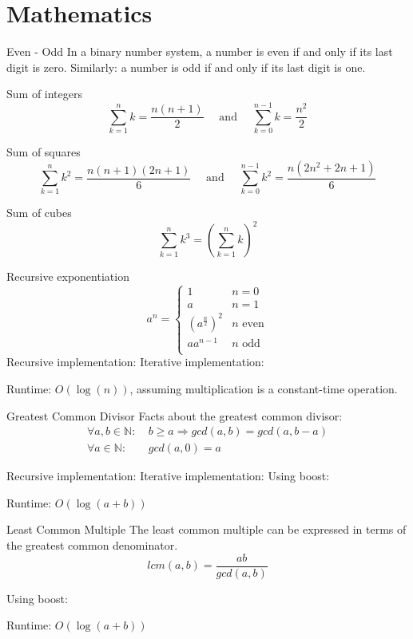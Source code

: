 \documentclass[guide.tex]{subfiles}
\begin{document}
\section{Mathematics}

\begin{matht}{Even - Odd}
  In a binary number system, a number is even if and only if its last digit is zero.
  Similarly: a number is odd if and only if its last digit is one.

\end{matht}

\begin{matht}{Sum of integers}
  \[
    \sum_{k = 1}^{n}k = \frac{n(n+1)}{2}
    \quad
    \text{ and }
    \quad
    \sum_{k = 0}^{n - 1}k = \frac{n^2}{2}
  \]
\end{matht}

\begin{matht}{Sum of squares}
  \[
    \sum_{k = 1}^{n}k^2 = \frac{n(n+1)(2n+1)}{6}
    \quad
    \text{ and }
    \quad
    \sum_{k = 0}^{n - 1}k^2 = \frac{n(2n^2+2n+1)}{6}
  \]
\end{matht}

\begin{matht}{Sum of cubes}
  \[
    \sum_{k = 1}^{n}k^3 = \left(\sum_{k = 1}^{n}k\right)^2
  \]
\end{matht}

\begin{matht}{Recursive exponentiation}
  \[
    a^n
    =
    \begin{cases}
      1 & n = 0\\
      a & n = 1\\
      \left(a^{\frac{n}{2}}\right)^{2} & n \text{ even}\\
      aa^{n-1} & n \text{ odd}\\
    \end{cases}
  \]
  Recursive implementation:
  Iterative implementation:

  Runtime: $O(\log(n))$, assuming multiplication is a constant-time operation.
\end{matht}

\begin{matht}{Greatest Common Divisor}
  Facts about the greatest common divisor:
  \begin{align*} 
    \forall a,b \in \mathbb{N}:\ & b \ge a \Rightarrow gcd(a, b) = gcd(a, b - a)\\
    \forall a \in \mathbb{N}:\ & gcd(a, 0) = a
  \end{align*}

  Recursive implementation:
  Iterative implementation:
  Using boost:

  Runtime: $O(\log(a + b))$
\end{matht}

\begin{matht}{Least Common Multiple}
  The least common multiple can be expressed in terms of the greatest common denominator.
  \[ lcm(a, b) = \frac{ab}{gcd(a, b)} \]

  Using boost:

  Runtime: $O(\log(a + b))$
\end{matht}
\end{document}

